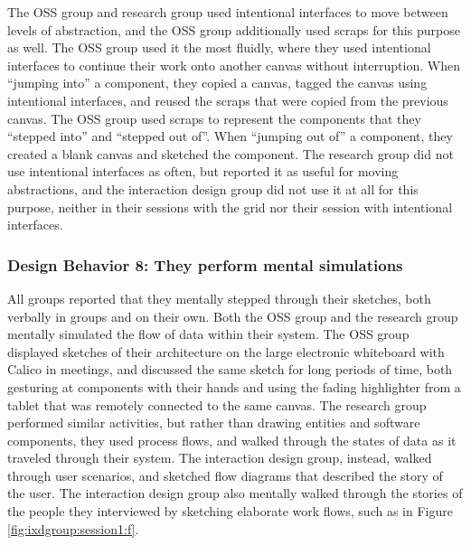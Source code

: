The OSS group and research group used intentional interfaces to move between levels of abstraction, and the OSS group additionally used scraps for this purpose as well. The OSS group used it the most fluidly, where they used intentional interfaces to continue their work onto another canvas without interruption. When ``jumping into'' a component, they copied a canvas, tagged the canvas using intentional interfaces, and reused the scraps that were copied from the previous canvas.  The OSS group used scraps to represent the components that they ``stepped into'' and ``stepped out of''. When ``jumping out of'' a component, they created a blank canvas and sketched the component. The research group did not use intentional interfaces as often, but reported it as useful for moving abstractions, and the interaction design group did not use it at all for this purpose, neither in their sessions with the grid nor their session with intentional interfaces.


\subsubsection{Design Behavior 8: They perform mental simulations}

All groups reported that they mentally stepped through their sketches, both verbally in groups and on their own. Both the OSS group and the research group mentally simulated the flow of data within their system. The OSS group displayed sketches of their architecture on the large electronic whiteboard with Calico in meetings, and discussed the same sketch for long periods of time, both gesturing at components with their hands and using the fading highlighter from a tablet that was remotely connected to the same canvas. The research group performed similar activities, but rather than drawing entities and software components, they used process flows, and walked through the states of data as it traveled through their system. The interaction design group, instead, walked through user scenarios, and sketched flow diagrams that described the story of the user. The interaction design group also mentally walked through the stories of the people they interviewed by sketching elaborate work flows, such as in Figure \ref{fig:ixdgroup:session1:f}.

